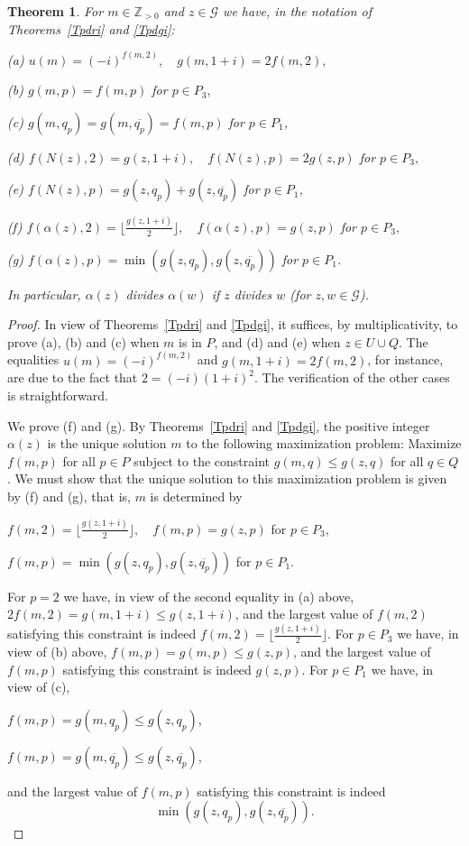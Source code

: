 \documentclass[12pt,letterpaper]{article}
\newcommand{\G}{\mathcal{G}}
\newcommand{\Z}{\mathbb{Z}}
\newtheorem{thm}{Theorem}%
\theoremstyle{definition}
\begin{document}
\begin{thm}\label{Tformulas}
For $m\in\Z_{>0}$ and $z\in\G$ we have, in the notation of Theorems~\ref{Tpdri} and \ref{Tpdgi}: 

\emph{(a)} $u(m)=(-i)^{f(m,2)},\quad g(m,1+i)=2f(m,2),$ 

\emph{(b)} $g(m,p)=f(m,p)$ for $p\in P_3,$ 

\emph{(c)} $g(m,q_p)=g(m,\overline{q_p})=f(m,p)$ for $p\in P_1$, 

\emph{(d)} $f(N(z),2)=g(z,1+i),\quad f(N(z),p)=2g(z,p)$ for $p\in P_3,$ 

\emph{(e)} $f(N(z),p)=g(z,q_p)+g(z,\overline{q_p})$ for $p\in P_1$, 

\emph{(f)} $f(\alpha(z),2)=\lfloor\frac{g(z,1+i)}{2}\rfloor,\quad f(\alpha(z),p)=g(z,p)$ for $p\in P_3,$ 

\emph{(g)} $f(\alpha(z),p)=\min(g(z,q_p),g(z,\overline{q_p}))$ for $p\in P_1$. 

In particular, $\alpha(z)$ divides $\alpha(w)$ if $z$ divides $w$ (for $z,w\in\G$). 
\end{thm}

\begin{proof}
In view of Theorems~\ref{Tpdri} and \ref{Tpdgi}, it suffices, by multiplicativity, to prove (a), (b) and (c) when $m$ is in $P$, and (d) and (e) when $z\in U\cup Q$. The equalities $u(m)=(-i)^{f(m,2)}$ and $g(m,1+i)=2f(m,2)$, for instance, are due to the fact that $2=(-i)(1+i)^2$. The verification of the other cases is straightforward. 

We prove (f) and (g). By Theorems~\ref{Tpdri} and \ref{Tpdgi}, the positive integer $\alpha(z)$ is the unique solution $m$ to the following maximization problem: Maximize $f(m,p)$ for all $p\in P$ subject to the constraint $g(m,q)\le g(z,q)$ for all $q\in Q$. We must show that the unique solution to this maximization problem is given by (f) and (g), that is, $m$ is determined by 

$f(m,2)=\lfloor\frac{g(z,1+i)}{2}\rfloor,\quad f(m,p)=g(z,p)$ for $p\in P_3,$ 

$f(m,p)=\min(g(z,q_p),g(z,\overline{q_p}))$ for $p\in P_1$. 

\noindent For $p=2$ we have, in view of the second equality in (a) above, $2f(m,2)=g(m,1+i)\le g(z,1+i)$, and the largest value of $f(m,2)$ satisfying this constraint is indeed $f(m,2)=\lfloor\frac{g(z,1+i)}{2}\rfloor$. For $p\in P_3$ we have, in view of (b) above, $f(m,p)=g(m,p)\le g(z,p)$, and the largest value of $f(m,p)$ satisfying this constraint is indeed $g(z,p)$. For $p\in P_1$ we have, in view of (c),  

$f(m,p)=g(m,q_p)\le g(z,q_p)$, 

$f(m,p)=g(m,\overline{q_p})\le g(z,\overline{q_p})$, 

\noindent and the largest value of $f(m,p)$ satisfying this constraint is indeed
\[
 \min(g(z,q_p),g(z,\overline{q_p})).
\]  
\end{proof}
\end{document}
